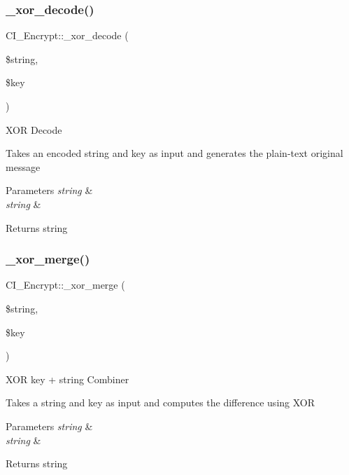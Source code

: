 \subsubsection{\texorpdfstring{\+\_\+xor\+\_\+decode()}{\_xor\_decode()}}
{\footnotesize\ttfamily C\+I\+\_\+\+Encrypt\+::\+\_\+xor\+\_\+decode (\begin{DoxyParamCaption}\item[{}]{\$string,  }\item[{}]{\$key }\end{DoxyParamCaption})\hspace{0.3cm}{\ttfamily [protected]}}

X\+OR Decode

Takes an encoded string and key as input and generates the plain-\/text original message


\begin{DoxyParams}{Parameters}
{\em string} & \\
\hline
{\em string} & \\
\hline
\end{DoxyParams}
\begin{DoxyReturn}{Returns}
string 
\end{DoxyReturn}
\mbox{\label{class_c_i___encrypt_a9e7f2617191f86339cea5b43f5c217ea}} 
\subsubsection{\texorpdfstring{\+\_\+xor\+\_\+merge()}{\_xor\_merge()}}
{\footnotesize\ttfamily C\+I\+\_\+\+Encrypt\+::\+\_\+xor\+\_\+merge (\begin{DoxyParamCaption}\item[{}]{\$string,  }\item[{}]{\$key }\end{DoxyParamCaption})\hspace{0.3cm}{\ttfamily [protected]}}

X\+OR key + string Combiner

Takes a string and key as input and computes the difference using X\+OR


\begin{DoxyParams}{Parameters}
{\em string} & \\
\hline
{\em string} & \\
\hline
\end{DoxyParams}
\begin{DoxyReturn}{Returns}
string 
\end{DoxyReturn}
\mbox{\label{class_c_i___encrypt_ae8e7633c806215f70d9406249bfbd799}} 
